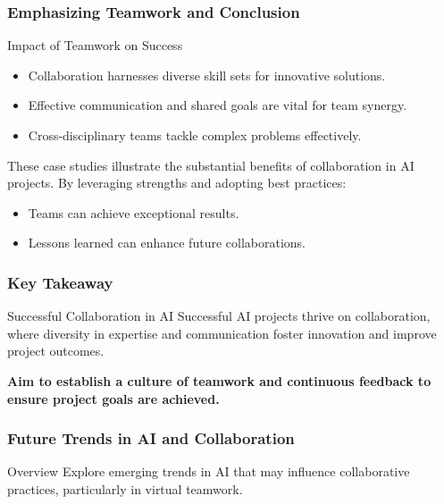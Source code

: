 \documentclass[aspectratio=169]{beamer}
\begin{document}
\begin{frame}[fragile]
    \frametitle{Emphasizing Teamwork and Conclusion}
    \begin{block}{Impact of Teamwork on Success}
        \begin{itemize}
            \item Collaboration harnesses diverse skill sets for innovative solutions.
            \item Effective communication and shared goals are vital for team synergy.
            \item Cross-disciplinary teams tackle complex problems effectively.
        \end{itemize}
    \end{block}
    These case studies illustrate the substantial benefits of collaboration in AI projects. By leveraging strengths and adopting best practices:
    \begin{itemize}
        \item Teams can achieve exceptional results.
        \item Lessons learned can enhance future collaborations.
    \end{itemize}
\end{frame}

\begin{frame}[fragile]
    \frametitle{Key Takeaway}
    \begin{block}{Successful Collaboration in AI}
        Successful AI projects thrive on collaboration, where diversity in expertise and communication foster innovation and improve project outcomes.
    \end{block}
    \textbf{Aim to establish a culture of teamwork and continuous feedback to ensure project goals are achieved.}
\end{frame}

\begin{frame}[fragile]
    \frametitle{Future Trends in AI and Collaboration}
    \begin{block}{Overview}
        Explore emerging trends in AI that may influence collaborative practices, particularly in virtual teamwork.
    \end{block}
\end{frame}
\end{document}

